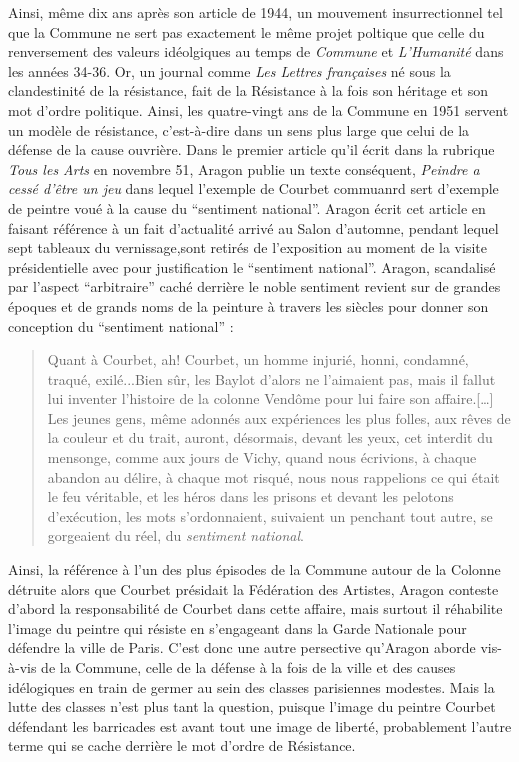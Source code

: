 Ainsi, même dix ans après son article de 1944, un mouvement insurrectionnel tel que la Commune ne sert pas exactement le même projet poltique que celle du renversement des valeurs idéolgiques au temps de \emph{Commune} et \emph{L'Humanité} dans les années 34-36. Or, un journal comme \emph{Les Lettres françaises} né sous la clandestinité de la résistance, fait de la Résistance à la fois son héritage et son mot d'ordre politique. Ainsi, les quatre-vingt ans de la Commune en 1951 servent un modèle de résistance, c'est-à-dire dans un sens plus large que celui de la défense de la cause ouvrière. Dans le premier article qu'il écrit dans la rubrique \emph{Tous les Arts} en novembre 51, Aragon publie un texte conséquent, \emph{Peindre a cessé d'être un jeu} dans lequel l'exemple de Courbet commuanrd sert d'exemple de peintre voué à la cause du \enquote{sentiment national}. Aragon écrit cet article en faisant référence à un fait d'actualité arrivé au Salon d'automne, pendant lequel sept tableaux du vernissage,sont retirés de l'exposition au moment de la visite présidentielle avec pour justification le \enquote{sentiment national}. Aragon, scandalisé par l'aspect \enquote{arbitraire} caché derrière le noble sentiment revient sur de grandes époques et de grands noms de la peinture à travers les siècles pour donner son conception du \enquote{sentiment national} : 
 
\begin{quote}
Quant à Courbet, ah! Courbet, un homme injurié, honni, condamné, traqué, exilé...Bien sûr, les Baylot d'alors ne l'aimaient pas, mais il fallut lui inventer l'histoire de la colonne Vendôme pour lui faire son affaire.[…] Les jeunes gens, même adonnés aux expériences les plus folles, aux rêves de la couleur et du trait, auront, désormais, devant les yeux, cet interdit du mensonge, comme aux jours de Vichy, quand nous écrivions, à chaque abandon au délire, à chaque mot risqué, nous nous rappelions ce qui était le feu véritable, et les héros dans les prisons et devant les pelotons d'exécution, les mots s'ordonnaient, suivaient un penchant tout autre, se gorgeaient du réel, du \emph{sentiment national}. 	
\end{quote}

Ainsi, la référence à l'un des plus épisodes de la Commune autour de la Colonne détruite alors que Courbet présidait la Fédération des Artistes, Aragon conteste d'abord la responsabilité de Courbet dans cette affaire, mais surtout il réhabilite l'image du peintre qui résiste en s'engageant dans la Garde Nationale pour défendre la ville de Paris. C'est donc une autre persective qu'Aragon aborde vis-à-vis de la Commune, celle de la défense à la fois de la ville et des causes idélogiques en train de germer au sein des classes parisiennes modestes. Mais la lutte des classes n'est plus tant la question, puisque l'image du peintre Courbet défendant les barricades est avant tout une image de liberté, probablement l'autre terme qui se cache derrière le mot d'ordre de Résistance. 

